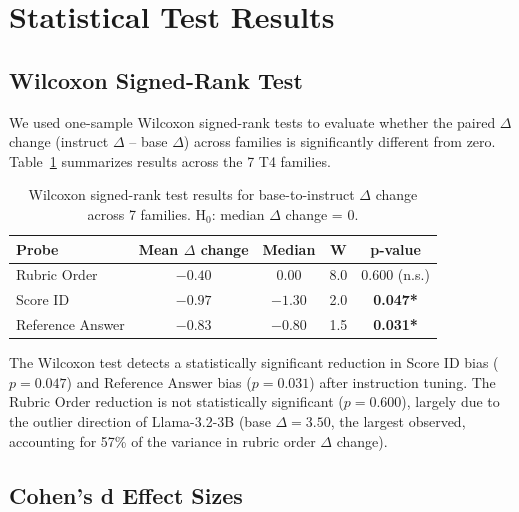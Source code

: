 \section{Statistical Test Results}
\label{app:statistical_tests}

\subsection{Wilcoxon Signed-Rank Test}

We used one-sample Wilcoxon signed-rank tests to evaluate whether the paired $\Delta$ change (instruct $\Delta$ -- base $\Delta$) across families is significantly different from zero. Table~\ref{tab:wilcoxon} summarizes results across the 7 T4 families.

\begin{table}[h]
\centering\small
\caption{Wilcoxon signed-rank test results for base-to-instruct $\Delta$ change across 7 families. H$_0$: median $\Delta$ change = 0.}
\label{tab:wilcoxon}
\begin{tabular}{lcccc}
\toprule
\textbf{Probe} & \textbf{Mean $\Delta$ change} & \textbf{Median} & \textbf{W} & \textbf{p-value} \\
\midrule
Rubric Order & $-0.40$ & $0.00$ & 8.0 & 0.600 (n.s.) \\
Score ID & $-0.97$ & $-1.30$ & 2.0 & \textbf{0.047*} \\
Reference Answer & $-0.83$ & $-0.80$ & 1.5 & \textbf{0.031*} \\
\bottomrule
\end{tabular}
\par\vspace{2mm}
\end{table}

The Wilcoxon test detects a statistically significant reduction in Score ID bias ($p = 0.047$) and Reference Answer bias ($p = 0.031$) after instruction tuning. The Rubric Order reduction is not statistically significant ($p = 0.600$), largely due to the outlier direction of Llama-3.2-3B (base $\Delta = 3.50$, the largest observed, accounting for 57\% of the variance in rubric order $\Delta$ change).

\subsection{Cohen's d Effect Sizes}


